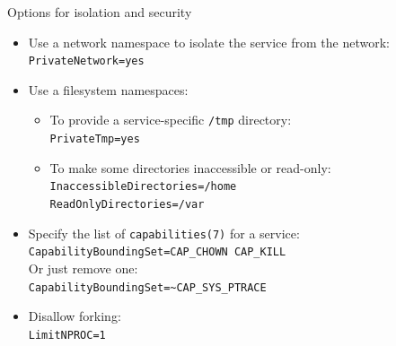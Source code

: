 \documentclass[11pt,final,usepdftitle=false]{beamer}
\begin{document}
\begin{frame}{Options for isolation and security}
	\begin{itemize}
		\item Use a \alert{network namespace} to isolate the service from the network:\\
			\texttt{PrivateNetwork=yes}
			\hbr
		\item Use a \alert{filesystem namespaces}:
			\begin{itemize}
				\item To provide a service-specific \texttt{/tmp} directory:\\
					\texttt{PrivateTmp=yes}
					\hbr
				\item To make some directories inaccessible or read-only:\\
					\texttt{InaccessibleDirectories=/home}\\
					\texttt{ReadOnlyDirectories=/var}
			\end{itemize}
			\hbr
		\item Specify the list of \alert{\texttt{capabilities(7)}} for a service:\\
			\texttt{CapabilityBoundingSet=CAP\_CHOWN CAP\_KILL}\\
			Or just remove one:\\
			\texttt{CapabilityBoundingSet=\textasciitilde{}CAP\_SYS\_PTRACE}
			\hbr
		\item Disallow forking:\\
			\texttt{LimitNPROC=1}
	\end{itemize}
\end{frame}
\end{document}
